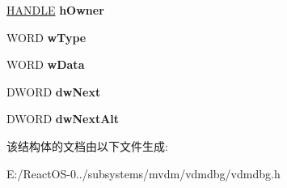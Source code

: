 \begin{DoxyCompactItemize}
\hyperlink{interfacevoid}{H\+A\+N\+D\+LE} {\bfseries h\+Owner}
\item 
\mbox{\label{struct_g_l_o_b_a_l_e_n_t_r_y_a64625ed0a22351a1e5b907b190a9ab11}} 
W\+O\+RD {\bfseries w\+Type}
\item 
\mbox{\label{struct_g_l_o_b_a_l_e_n_t_r_y_a3e662ccb5c5f7f1bbd67b8001b1235fc}} 
W\+O\+RD {\bfseries w\+Data}
\item 
\mbox{\label{struct_g_l_o_b_a_l_e_n_t_r_y_a6c8acdc658dd8ffe5526812b86b57118}} 
D\+W\+O\+RD {\bfseries dw\+Next}
\item 
\mbox{\label{struct_g_l_o_b_a_l_e_n_t_r_y_a4b0e95ee355124f5f3ddd6d16e87f06c}} 
D\+W\+O\+RD {\bfseries dw\+Next\+Alt}
\end{DoxyCompactItemize}


该结构体的文档由以下文件生成\+:\begin{DoxyCompactItemize}
\item 
E\+:/\+React\+O\+S-\/0../subsystems/mvdm/vdmdbg/vdmdbg.\+h\end{DoxyCompactItemize}
